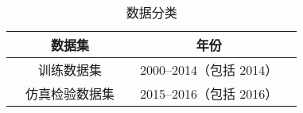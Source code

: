     \begin{table}[thb]
      \centering
      \caption{数据分类}
      \begin{tabular*}{0.618\paperwidth}{@{\extracolsep{\fill}}ccccc}
        \toprule[1.5pt]
        &数据集 && 年份 &\\
        \midrule[1pt]
        &训练数据集 && 2000--2014（包括 2014） &\\
        &仿真检验数据集 && 2015--2016（包括 2016） &\\
        \bottomrule[1.5pt]
      \end{tabular*}
      \label{tab:shujufenlei}
    \end{table}